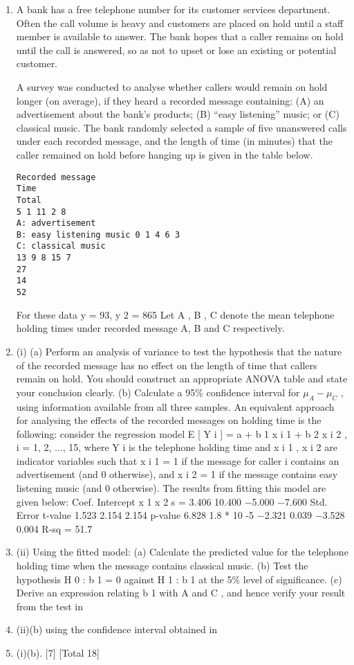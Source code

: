\documentclass[a4paper,12pt]{article}
\begin{document}
\begin{enumerate}

\item A bank has a free telephone number for its customer services department. Often the call volume is heavy and customers are placed on hold until a staff member is available to answer. The bank hopes that a caller remains on hold until the call is
answered, so as not to upset or lose an existing or potential customer.

A survey was conducted to analyse whether callers would remain on hold longer (on average), if they heard a recorded message containing: (A) an advertisement about the bank’s products; (B) “easy listening” music; or (C) classical music. The bank
randomly selected a sample of five unanswered calls under each recorded message, and the length of time (in minutes) that the caller remained on hold before hanging up is given in the table below.
\begin{verbatim}
Recorded message
Time
Total
5 1 11 2 8
A: advertisement
B: easy listening music 0 1 4 6 3
C: classical music
13 9 8 15 7
27
14
52
\end{verbatim}
For these data \sigma y = 93, \sigma y 2 = 865
Let \mu  A , \mu  B , \mu  C denote the mean telephone holding times under recorded message A, B and C respectively.
\item (i)
(a) Perform an analysis of variance to test the hypothesis that the nature of the recorded message has no effect on the length of time that callers remain on hold. You should construct an appropriate ANOVA table and state your conclusion clearly.
(b) Calculate a 95\% confidence interval for $\mu_A − \mu_C$ , using information available from all three samples.
An equivalent approach for analysing the effects of the recorded messages on holding
time is the following:
consider the regression model E [ Y i ] = a + b 1 x i 1 + b 2 x i 2 , i = 1, 2, ..., 15, where
Y i is the telephone holding time and x i 1 , x i 2 are indicator variables such that x i 1 = 1 if the message for caller i contains an advertisement (and 0 otherwise), and x i 2 = 1 if the message contains easy listening music (and 0 otherwise).
The results from fitting this model are given below:
Coef.
Intercept
x 1
x 2
s = 3.406
10.400
−5.000
−7.600
Std. Error t-value
1.523
2.154
2.154
p-value
6.828 1.8 * 10 -5
−2.321
0.039
−3.528
0.004
R-sq = 51.7%
\item (ii)
Using the fitted model:
(a) Calculate the predicted value for the telephone holding time when the
message contains classical music.
(b) Test the hypothesis H 0 : b 1 = 0 against H 1 : b 1  at the 5\% level of
significance.
(c) Derive an expression relating b 1 with \mu  A and \mu  C , and hence verify
your result from the test in \item (ii)(b) using the confidence interval
obtained in \item (i)(b).
[7]
[Total 18]
\end{enumerate}
\end{document}
